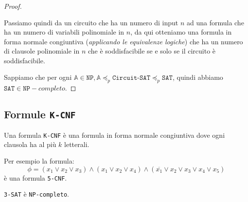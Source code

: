 \begin{proof}
\begin{enumerate}
            Passiamo quindi da un circuito che ha un numero di input $n$ ad una 
            formula che ha un numero di variabili polinomiale in $n$, da qui 
            otteniamo una formula in forma normale congiuntiva (\textit{applicando 
            le equivalenze logiche}) che ha un numero di clausole polinomiale in $n$ 
            che è soddisfacibile se e solo se il circuito è soddisfacibile.
    \end{enumerate}
    Sappiamo che per ogni $\mathbb{A} \in \texttt{NP}, \mathbb{A}
    \preceq_p \texttt{Circuit-SAT} \preceq_p \texttt{SAT}$, quindi abbiamo 
    $\texttt{SAT} \in \texttt{NP}-completo$.
\end{proof}
\subsection{Formule \texttt{K-CNF}}
Una formula \texttt{K-CNF} è una formula in forma normale congiuntiva 
dove ogni clausola ha al più $k$ letterali.

Per esempio la formula:
\[
    \phi = (x_1 \lor x_2 \lor x_3) \land (x_1 \lor x_2 \lor x_4) \land
    (\overline{x_1} \lor x_2 \lor x_3 \lor x_4 \lor x_5)
\]
è una formula \texttt{5-CNF}.

\begin{theorem}
    \texttt{3-SAT} è \texttt{NP-completo}.
\end{theorem}

